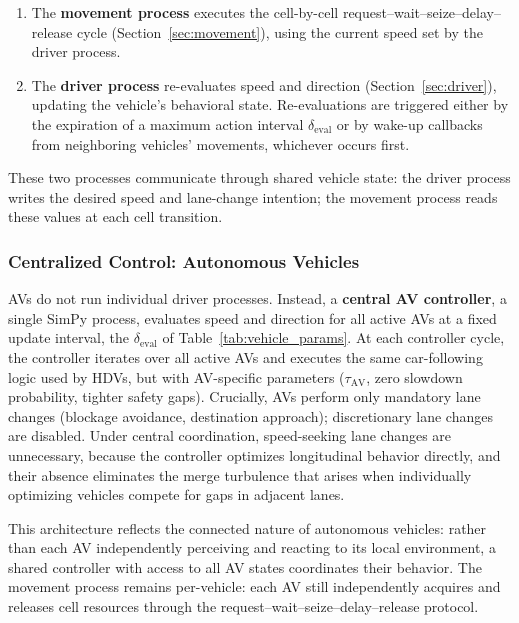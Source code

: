\documentclass[review,authoryear]{elsarticle}
\begin{document}
\begin{enumerate}
    \item The \textbf{movement process} executes the cell-by-cell request--wait--seize--delay--release cycle (Section~\ref{sec:movement}), using the current speed set by the driver process.

    \item The \textbf{driver process} re-evaluates speed and direction (Section~\ref{sec:driver}), updating the vehicle's behavioral state. Re-evaluations are triggered either by the expiration of a maximum action interval $\delta_{\text{eval}}$ or by wake-up callbacks from neighboring vehicles' movements, whichever occurs first.
\end{enumerate}

These two processes communicate through shared vehicle state: the driver process writes the desired speed and lane-change intention; the movement process reads these values at each cell transition.

\subsubsection{Centralized Control: Autonomous Vehicles}
\label{sec:av_controller}

AVs do not run individual driver processes. Instead, a \textbf{central AV controller}, a single SimPy process, evaluates speed and direction for all active AVs at a fixed update interval, the $\delta_{\text{eval}}$ of Table~\ref{tab:vehicle_params}. At each controller cycle, the controller iterates over all active AVs and executes the same car-following logic used by HDVs, but with AV-specific parameters ($\tau_{\text{AV}}$, zero slowdown probability, tighter safety gaps). Crucially, AVs perform only mandatory lane changes (blockage avoidance, destination approach); discretionary lane changes are disabled. Under central coordination, speed-seeking lane changes are unnecessary, because the controller optimizes longitudinal behavior directly, and their absence eliminates the merge turbulence that arises when individually optimizing vehicles compete for gaps in adjacent lanes.

This architecture reflects the connected nature of autonomous vehicles: rather than each AV independently perceiving and reacting to its local environment, a shared controller with access to all AV states coordinates their behavior. The movement process remains per-vehicle: each AV still independently acquires and releases cell resources through the request--wait--seize--delay--release protocol.
\end{document}
